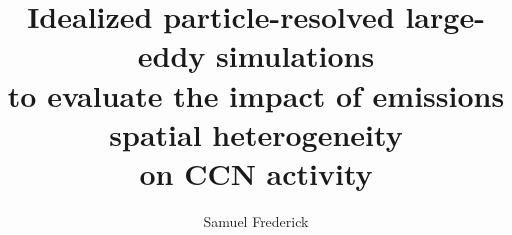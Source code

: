 \documentclass[11pt]{./uiuc_thesis_template/uiucthesis2021} %
\begin{document}
\doublespacing

\title{Idealized particle-resolved large-eddy simulations \\
to evaluate the impact of emissions spatial heterogeneity\\
on CCN activity}
\author{Samuel Frederick}
\msthesis %
{}
\maketitle

\frontmatter

 


\begin{acknowledgments}

\end{acknowledgments}

{
    \hypersetup{linkcolor=black}  %
    \setcounter{tocdepth}{2} %
    \tableofcontents
     \listoftables
     \listoffigures
}



\end{document}
